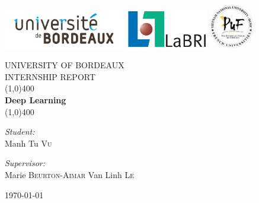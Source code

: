 \documentclass[hidelinks,12pt,a4paper]{report}
\title{}
\author{Tu \textsc{Vu}}
\date{\today}
\begin{document}
\begin{titlepage}
\includegraphics[height=1.75cm, valign=c]{images/bordeaux_logo.jpg}
\hspace*{0.3cm}\includegraphics[height=1.75cm, valign=c]{images/LaBRI_logo.jpg}
\hspace*{1.3cm}\includegraphics[height=1.95cm, valign=c]{images/puf_logo.jpg}\\[1.5cm]
		
	\begin{center}
	
	
	\textsc{\Large UNIVERSITY OF BORDEAUX}\\[1.5cm] %
	
	\textsc{\large INTERNSHIP REPORT}\\[1.5cm] %


	
	\line(1,0){400}\\[0.2in]
	\huge{\bfseries Deep Learning}\\
	\line(1,0){400}\\[1.5cm]
	\noindent	
	\begin{minipage}{0.4\textwidth}
		\begin{flushleft} \large
    	\emph{Student:}\\
    	Manh Tu \textsc{Vu}
		\end{flushleft}
	\end{minipage}
	\begin{minipage}{0.4\textwidth}
  		\begin{flushright} \large
    		\emph{Supervisor:} \\
    		Marie \textsc{Beurton-Aimar}
    		Van Linh \textsc{Le}
  		\end{flushright}
	\end{minipage}
	
	\vfill

{\large \today}
	\end{center}
\end{titlepage}
\end{document}
